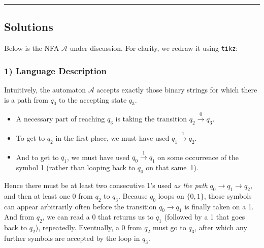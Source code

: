 \documentclass{article}
\theoremstyle{theorem}
\theoremstyle{definition}
\theoremstyle{remark}
\begin{document}
\bigskip
\hrule
\bigskip

\subsection*{Solutions}

Below is the NFA $\mathcal{A}$ under discussion. For clarity, we redraw it using \texttt{tikz}:

\begin{center}
\end{center}

\subsubsection*{1) Language Description}
Intuitively, the automaton $\mathcal{A}$ accepts exactly those binary strings for which there is a path from $q_0$ to the accepting state $q_3$.  
\begin{itemize}
\item A necessary part of reaching $q_3$ is taking the transition $q_2 \xrightarrow{0} q_3$. 
\item To get to $q_2$ in the first place, we must have used $q_1 \xrightarrow{1} q_2$. 
\item And to get to $q_1$, we must have used $q_0 \xrightarrow{1} q_1$ on some occurrence of the symbol 1 (rather than looping back to $q_0$ on that same~1).
\end{itemize}
Hence there must be at least two consecutive 1's used \emph{as the path} $q_0 \to q_1 \to q_2$, and then at least one 0 from $q_2$ to $q_3$.  Because $q_0$ loops on $\{0,1\}$, those symbols can appear arbitrarily often before the transition $q_0\to q_1$ is finally taken on a 1.  And from $q_2$, we can read a 0 that returns us to $q_1$ (followed by a 1 that goes back to $q_2$), repeatedly.  Eventually, a 0 from $q_2$ must go to $q_3$, after which any further symbols are accepted by the loop in $q_3$.  
\end{document}
